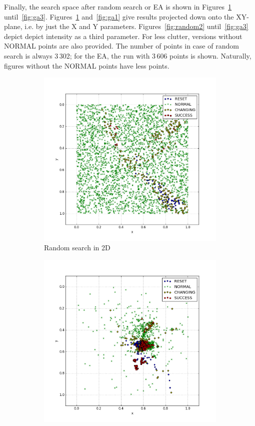\documentclass[times, utf8, diplomski]{fer}
\begin{document}
Finally, the search space after random search or EA is shown in Figures~\ref{fig:random1}
until~\ref{fig:ga3}. Figures~\ref{fig:random1} and~\ref{fig:ga1} give results
projected down onto the XY-plane, i.e. by just the X and Y parameters. Figures~\ref{fig:random2}
until~\ref{fig:ga3} depict depict intensity as a third parameter. For less clutter,
versions without NORMAL points are also provided. The number of points in case
of random search is always 3\,302; for the EA, the run with 3\,606 points is shown.
Naturally, figures without the NORMAL points have less points.

\begin{figure}
	\centering
	\begin{subfigure}[b]{0.49\textwidth}
		\includegraphics[width=0.98\linewidth]{images/plots/plot_random_2D.png}
		\caption{Random search in 2D}
		\label{fig:random1}
	\end{subfigure}
	\begin{subfigure}[b]{0.49\textwidth}
		\includegraphics[width=0.98\linewidth]{images/plots/plot_GA_3_2D.png}

\end{subfigure}
\end{figure}
\end{document}
